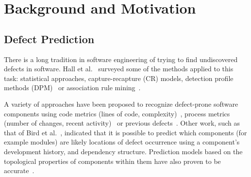 \documentclass[10pt,conference]{IEEEtran}
\theoremstyle{break}
\theoremstyle{break}
\begin{document}

 



 


\section{Background and Motivation}

\subsection{Defect Prediction}
\label{sect:review}

There is a long tradition in software engineering of trying to find undiscovered defects in software. 
Hall et al.~\cite{hall2012systematic} surveyed some of the methods
applied to this task: statistical approaches, capture-recapture 
(CR) models, detection profile methods (DPM)~\cite{song2011general} or
association rule mining~\cite{song2006software}. 

A variety of approaches have been proposed to recognize
 defect-prone  software components using code metrics (lines of code, complexity)~\cite{d2010extensive,menzies2007data, nagappan2006mining,shepperd2014researcher,Menzies2010}, process metrics (number of changes, recent activity)~\cite{hassan2009predicting} or previous defects~\cite{kim2007predicting}.
Other work, such as that of 
Bird et al.~\cite{bird2009putting}, indicated that it is possible to predict which components (for example modules) are likely locations of
defect occurrence using a component's development history,
and dependency structure. 
Prediction models based on the topological properties
of components within them have also  proven to be  
accurate~\cite{zimmermann2008predicting}.
\end{document}
